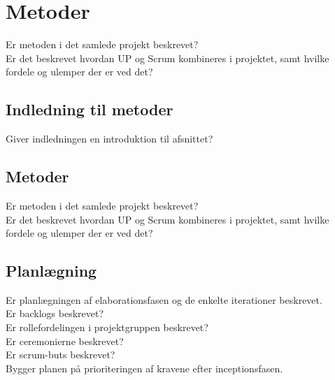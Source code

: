 \section{Metoder}
Er metoden i det samlede projekt beskrevet?\\
Er det beskrevet hvordan UP og Scrum kombineres i projektet, samt hvilke fordele og ulemper der er ved det?\\

\subsection{Indledning til metoder}
Giver indledningen en introduktion til  afsnittet?\\
\subsection{Metoder}
Er metoden i det samlede projekt beskrevet?\\
Er det beskrevet hvordan UP og Scrum kombineres i projektet, samt hvilke fordele og ulemper der er ved det?\\
\subsection{Planlægning}
Er planlægningen af elaborationsfasen og de enkelte iterationer beskrevet.\\
Er backlogs beskrevet?\\
Er rollefordelingen i projektgruppen beskrevet?\\
Er ceremonierne beskrevet?\\
Er scrum-buts beskrevet?\\
Bygger planen på prioriteringen af kravene efter inceptionsfasen.\\